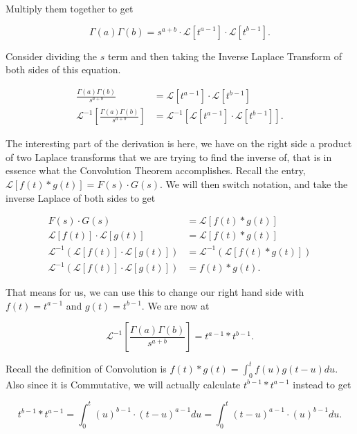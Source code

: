 \documentclass[12pt]{article}
\newcommand{\lp}{\mathscr{L}}
\begin{document}
Multiply them together to get

\begin{equation*}
    \Gamma(a)\Gamma(b)=s^{a+b} \cdot \lp[t^{a-1}] \cdot \lp[t^{b-1}].
\end{equation*}

Consider dividing the $s$ term and then taking the Inverse Laplace Transform of both sides of this equation.

\begin{align*}
    \frac{\Gamma(a)\Gamma(b)}{s^{a+b}} &= \lp[t^{a-1}] \cdot \lp[t^{b-1}] \\
    \lp^{-1}\left[\frac{\Gamma(a)\Gamma(b)}{s^{a+b}}\right] &= \lp^{-1}\left[\lp[t^{a-1}] \cdot \lp[t^{b-1}]\right].
\end{align*}

The interesting part of the derivation is here, we have on the right side a product of two Laplace transforms that we are trying to find the inverse of, that is in essence what the Convolution Theorem accomplishes. Recall the entry, $\lp[f(t) \ast g(t)] = F(s)\cdot G(s)$. We will then switch notation, and take the inverse Laplace of both sides to get

\begin{align*}
    F(s)\cdot G(s) &= \lp[f(t) \ast g(t)] \\
    \lp[f(t)]\cdot\lp[g(t)] &= \lp[f(t) \ast g(t)] \\
    \lp^{-1}(\lp[f(t)]\cdot\lp[g(t)])&=\lp^{-1}(\lp[f(t) \ast g(t)]) \\
    \lp^{-1}(\lp[f(t)]\cdot\lp[g(t)])&=f(t) \ast g(t).
\end{align*}

That means for us, we can use this to change our right hand side with $f(t)=t^{a-1}$ and $g(t)=t^{b-1}$. We are now at

\begin{equation*}
    \lp^{-1}\left[\frac{\Gamma(a)\Gamma(b)}{s^{a+b}}\right] = t^{a-1} \ast t^{b-1}.
\end{equation*}

Recall the definition of Convolution is $f(t) \ast g(t) = \int_{0}^{t} f(u)g(t-u) du$. Also since it is Commutative, we will actually calculate $t^{b-1} \ast t^{a-1}$ instead to get

\begin{equation*}
    t^{b-1} \ast t^{a-1} = \int_{0}^{t} (u)^{b-1}\cdot(t-u)^{a-1} du = \int_{0}^{t} (t-u)^{a-1} \cdot (u)^{b-1} du.
\end{equation*}
\end{document}

